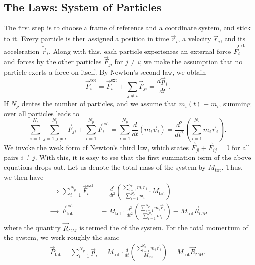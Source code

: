 \subsection{The Laws: System of Particles}
The first step is to choose a frame of reference and a coordinate system, and stick to it. Every particle is then assigned a position in time $\vec{r}_{i}$, a velocity $\dot{\vec{r}}_{i}$, and its acceleration $\ddot{\vec{r}}_{i}$. Along with this, each particle experiences an external force $\vec{F}_{i}^{\text{ext}}$ and forces by the other particles $\vec{F}_{ji}$ for $j \neq i$; we make the assumption that no particle exerts a force on itself. By Newton's second law, we obtain
\begin{equation}
    \vec{F}_{i}^{\text{tot}} = \vec{F}_{i}^{\text{ext}} + \sum_{j \neq i} \vec{F}_{ji} = \frac{d\vec{p}_{i}}{dt}.
\end{equation}
If $N_{p}$ dentes the number of particles, and we assume that $m_{i}(t) \equiv m_{i}$, summing over all particles leads to
\begin{equation}
    \sum_{i=1}^{N_{p}} \sum_{j=1,j\neq i}^{N_{p}} \vec{F}_{ji} + \sum_{i=1}^{N_{p}} \vec{F}_{i}^{\text{ext}} = \sum_{i=1}^{N_{p}} \frac{d}{dt} (m_{i}\vec{v}_{i}) = \frac{d^{2}}{dt^{2}} \left( \sum_{i=1}^{N_{p}} m_{i}\vec{r}_{i} \right).
\end{equation}
We invoke the weak form of Newton's third law, which states $\vec{F}_{ji} + \vec{F}_{ij} = 0$ for all pairs $i \neq j$. With this, it is easy to see that the first summation term of the above equations drops out. Let us denote the total mass of the system by $M_{\text{tot}}$. Thus, we then have
\begin{align}
    \implies \sum_{i=1}^{N_{p}} \vec{F}_{i}^{\text{ext}} &= \frac{d^{2}}{dt^{2}} \left( \frac{\sum_{i=1}^{N_{p}} m_{i}\vec{r}_{i}}{\sum_{i=1}^{N_{p}} m_{i}} \cdot M_{\text{tot}} \right) \\
    \implies \vec{F}_{\text{tot}}^{\text{ext}} &= M_{\text{tot}} \cdot \frac{d^{2}}{dt^{2}} \left( \frac{\sum_{i=1}^{N_{p}} m_{i}\vec{r}_{i}}{\sum_{i=1}^{N_{p}} m_{i}} \right) = M_{\text{tot}} \ddot{\vec{R}}_{CM}
\end{align}
where the quantity $\vec{R}_{CM}$ is termed the  of the system. For the total momentum of the system, we work roughly the same---
\begin{align}
    \vec{P}_{\text{tot}} = \sum_{i=1}^{N_{p}} \vec{p}_{i} = M_{\text{tot}} \cdot \frac{d}{dt} \left( \frac{\sum_{i=1}^{N_{p}}m_{i}\vec{r}_{i}}{M_{\text{tot}}} \right) = M_{\text{tot}} \dot{\vec{R}}_{CM}.
\end{align}
